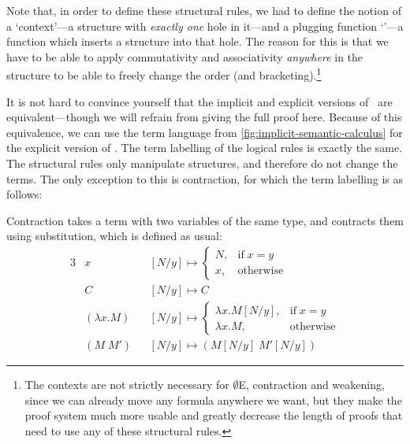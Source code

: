 

Note that, in order to define these structural rules, we had to define
the notion of a `context'---a structure with \emph{exactly one} hole
in it---and a plugging function `\plug'---a function which inserts a
structure into that hole. The reason for this is that we have to be
able to apply commutativity and associativity \emph{anywhere} in the
structure to be able to freely change the order (and
bracketing).\footnote{%
  The contexts are not strictly necessary for $\emptyset$E,
  contraction and weakening, since we can already move any formula
  anywhere we want, but they make the proof system much more usable
  and greatly decrease the length of proofs that need to use any of
  these structural rules.
}

It is not hard to convince yourself that the implicit and explicit
versions of \lamET\ are equivalent---though we will refrain from
giving the full proof here.
Because of this equivalence, we can use the term language from
\autoref{fig:implicit-semantic-calculus} for the explicit version of
\lamET.
The term labelling of the logical rules is exactly the same. The
structural rules only manipulate structures, and therefore do not
change the terms. The only exception to this is contraction, for which
the term labelling is as follows:
\begin{prooftree}
\end{prooftree}
Contraction takes a term with two variables of the same type, and
contracts them using substitution, which is defined as usual:
\begin{alignat*}{3}
  &x             &&[N/y] \mapsto
  \begin{cases}
    N, &\text{if}\;x=y\\
    x, &\text{otherwise}
  \end{cases}
  \\
  &C             &&[N/y] \mapsto C\\
  &(\lambda x.M) &&[N/y] \mapsto
  \begin{cases}
    \lambda x.M[N/y], &\text{if}\;x=y\\
    \lambda x.M,      &\text{otherwise}
  \end{cases}
  \\
  &(M\;M')       &&[N/y] \mapsto (M[N/y]\;M'[N/y])
\end{alignat*}

